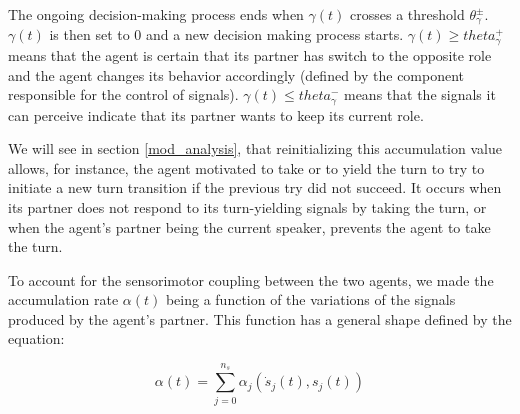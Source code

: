The ongoing decision-making process ends when $\gamma(t)$ crosses a threshold $\theta_{\gamma}^{\pm}$. $\gamma(t)$ is then set to 0 and a new decision making process starts.
$\gamma(t) \geq theta_{\gamma}^{+}$ means that the agent is certain that its partner has switch to the opposite role and the agent changes its behavior accordingly (defined by the component responsible for the control of signals). $\gamma(t) \leq theta_{\gamma}^{-}$ means that the signals it can perceive indicate that its partner wants to keep its current role. 


We will see in section \ref{mod_analysis}, that reinitializing this accumulation value allows, for instance, the agent motivated to take or to yield the turn to try to initiate a new turn transition if the previous try did not succeed. 
It occurs when its partner does not respond to its turn-yielding signals by taking the turn, or when the agent's partner being the current speaker, prevents the agent to take the turn.

To account for the sensorimotor coupling between the two agents, we made the accumulation rate $\alpha(t)$ being a function of the variations of the signals produced by the agent's partner. This function has a general shape defined by the equation: 

\begin{equation}
  \alpha(t) = \sum_{j=0}^{n_{s}} \alpha_{j}(\dot{s}_j(t),s_j(t))
  \label{alpha_func}
\end{equation}


